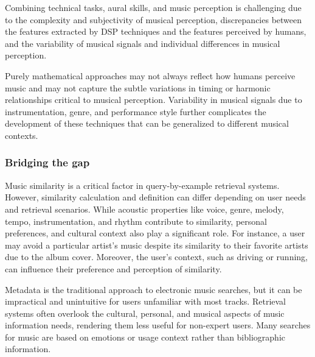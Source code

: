 Combining technical tasks, aural skills, and music perception is challenging due to the complexity and subjectivity of musical perception, discrepancies between the features extracted by DSP techniques and the features perceived by humans, and the variability of musical signals and individual differences in musical perception. 

Purely mathematical approaches may not always reflect how humans perceive music and may not capture the subtle variations in timing or harmonic relationships critical to musical perception. Variability in musical signals due to instrumentation, genre, and performance style further complicates the development of these techniques that can be generalized to different musical contexts.




\subsubsection{Bridging the gap}

Music similarity is a critical factor in query-by-example retrieval systems. However, similarity calculation and definition can differ depending on user needs and retrieval scenarios. While acoustic properties like voice, genre, melody, tempo, instrumentation, and rhythm contribute to similarity, personal preferences, and cultural context also play a significant role. For instance, a user may avoid a particular artist's music despite its similarity to their favorite artists due to the album cover. Moreover, the user's context, such as driving or running, can influence their preference and perception of similarity. 

Metadata is the traditional approach to electronic music searches, but it can be impractical and unintuitive for users unfamiliar with most tracks. Retrieval systems often overlook the cultural, personal, and musical aspects of music information needs, rendering them less useful for non-expert users. Many searches for music are based on emotions or usage context rather than bibliographic information.